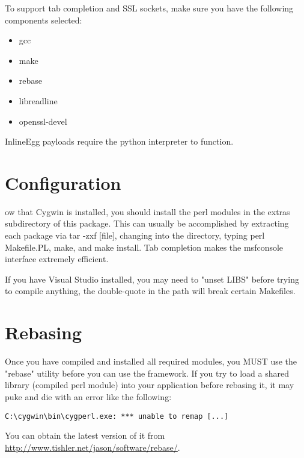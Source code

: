 \documentclass{report}
\begin{document}
\par
To support tab completion and SSL sockets, make sure you have the following
components selected:

\begin{itemize}
\item gcc
\item make
\item rebase
\item libreadline
\item openssl-devel
\end{itemize}

\par
InlineEgg payloads require the python interpreter to function.



	\section{Configuration}
\par
ow that Cygwin is installed, you should install the perl modules in the extras
subdirectory of this package. This can usually be accomplished by extracting
each package via tar -zxf [file], changing into the directory, typing
perl Makefile.PL, make, and make install. Tab completion makes the msfconsole
interface extremely efficient.

\par
If you have Visual Studio installed, you may need to "unset LIBS" before trying
to compile anything, the double-quote in the path will break certain Makefiles.


	\section{Rebasing}
\par
Once you have compiled and installed all required modules, you MUST use the
"rebase" utility before you can use the framework. If you try to load a shared
library (compiled perl module) into your application before rebasing it, it may
puke and die with an error like the following:

\begin{verbatim}
C:\cygwin\bin\cygperl.exe: *** unable to remap [...]
\end{verbatim}

\par
You can obtain the latest version of it from
\url{http://www.tishler.net/jason/software/rebase/}.
\end{document}
